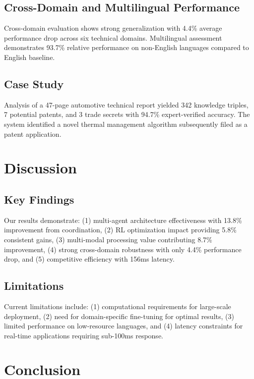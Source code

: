 \documentclass[11pt,a4paper]{article}
\begin{document}
\subsection{Cross-Domain and Multilingual Performance}

Cross-domain evaluation shows strong generalization with 4.4\% average performance drop across six technical domains. Multilingual assessment demonstrates 93.7\% relative performance on non-English languages compared to English baseline.

\subsection{Case Study}

Analysis of a 47-page automotive technical report yielded 342 knowledge triples, 7 potential patents, and 3 trade secrets with 94.7\% expert-verified accuracy. The system identified a novel thermal management algorithm subsequently filed as a patent application.

\section{Discussion}

\subsection{Key Findings}

Our results demonstrate: (1) multi-agent architecture effectiveness with 13.8\% improvement from coordination, (2) RL optimization impact providing 5.8\% consistent gains, (3) multi-modal processing value contributing 8.7\% improvement, (4) strong cross-domain robustness with only 4.4\% performance drop, and (5) competitive efficiency with 156ms latency.

\subsection{Limitations}

Current limitations include: (1) computational requirements for large-scale deployment, (2) need for domain-specific fine-tuning for optimal results, (3) limited performance on low-resource languages, and (4) latency constraints for real-time applications requiring sub-100ms response.

\section{Conclusion}
\end{document}
